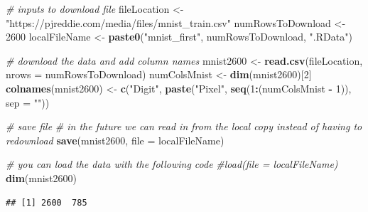 \documentclass[
]{article}
\newenvironment{Shaded}{\begin{snugshade}}{\end{snugshade}}
\newcommand{\AttributeTok}[1]{\textcolor[rgb]{0.13,0.29,0.53}{#1}}
\newcommand{\CommentTok}[1]{\textcolor[rgb]{0.56,0.35,0.01}{\textit{#1}}}
\newcommand{\DecValTok}[1]{\textcolor[rgb]{0.00,0.00,0.81}{#1}}
\newcommand{\FunctionTok}[1]{\textcolor[rgb]{0.13,0.29,0.53}{\textbf{#1}}}
\newcommand{\NormalTok}[1]{#1}
\newcommand{\OtherTok}[1]{\textcolor[rgb]{0.56,0.35,0.01}{#1}}
\newcommand{\SpecialCharTok}[1]{\textcolor[rgb]{0.81,0.36,0.00}{\textbf{#1}}}
\newcommand{\StringTok}[1]{\textcolor[rgb]{0.31,0.60,0.02}{#1}}
\begin{document}
\begin{Shaded}
\begin{Highlighting}[]
  \CommentTok{\# inputs to download file}
\NormalTok{  fileLocation }\OtherTok{\textless{}{-}} \StringTok{"https://pjreddie.com/media/files/mnist\_train.csv"}
\NormalTok{  numRowsToDownload }\OtherTok{\textless{}{-}} \DecValTok{2600}
\NormalTok{  localFileName }\OtherTok{\textless{}{-}} \FunctionTok{paste0}\NormalTok{(}\StringTok{"mnist\_first"}\NormalTok{, numRowsToDownload, }\StringTok{".RData"}\NormalTok{)}
  
  \CommentTok{\# download the data and add column names}
\NormalTok{  mnist2600 }\OtherTok{\textless{}{-}} \FunctionTok{read.csv}\NormalTok{(fileLocation, }\AttributeTok{nrows =}\NormalTok{ numRowsToDownload)}
\NormalTok{  numColsMnist }\OtherTok{\textless{}{-}} \FunctionTok{dim}\NormalTok{(mnist2600)[}\DecValTok{2}\NormalTok{]}
  \FunctionTok{colnames}\NormalTok{(mnist2600) }\OtherTok{\textless{}{-}} \FunctionTok{c}\NormalTok{(}\StringTok{"Digit"}\NormalTok{, }\FunctionTok{paste}\NormalTok{(}\StringTok{"Pixel"}\NormalTok{, }\FunctionTok{seq}\NormalTok{(}\DecValTok{1}\SpecialCharTok{:}\NormalTok{(numColsMnist }\SpecialCharTok{{-}} \DecValTok{1}\NormalTok{)), }\AttributeTok{sep =} \StringTok{""}\NormalTok{))}
  
  \CommentTok{\# save file}
  \CommentTok{\# in the future we can read in from the local copy instead of having to redownload}
  \FunctionTok{save}\NormalTok{(mnist2600, }\AttributeTok{file =}\NormalTok{ localFileName)}

  \CommentTok{\# you can load the data with the following code}
  \CommentTok{\#load(file = localFileName)}
  \FunctionTok{dim}\NormalTok{(mnist2600)}
\end{Highlighting}
\end{Shaded}

\begin{verbatim}
## [1] 2600  785
\end{verbatim}
\end{document}
